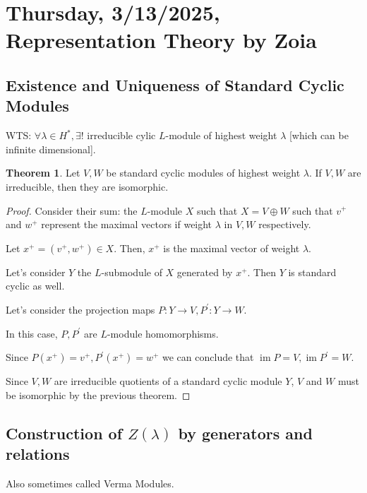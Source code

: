 \documentclass{article}
\theoremstyle{definition}
\newtheorem{theorem}{Theorem}
\begin{document}
    \section{Thursday, 3/13/2025, Representation Theory by Zoia}

    \subsection*{Existence and Uniqueness of Standard Cyclic Modules}

    WTS: \(\forall \lambda \in H^{\ast}, \exists !\) irreducible cylic \(L\)-module of highest weight \(\lambda\) [which can be infinite dimensional].
    
    \begin{theorem}
        Let \(V,W\) be standard cyclic modules of highest weight \(\lambda\). If \(V,W\) are irreducible, then they are isomorphic.
    \end{theorem}
    
    \begin{proof}
        Consider their sum: the \(L\)-module \(X\) such that \(X = V \oplus W\) such that \(v^+\) and \(w^+\) represent the maximal vectors if weight \(\lambda\) in \(V,W\) respectively.

        Let \(x^+=(v^+,w^+)\in X\). Then, \(x^+\) is the maximal vector of weight \(\lambda\).

        Let's consider \(Y\) the \(L\)-submodule of \(X\) generated by \(x^+\). Then \(Y\) is standard cyclic as well.

        Let's consider the projection maps \(P: Y \to V, P^{\prime}: Y \to W\).

        In this case, \(P, P^{\prime}\) are \(L\)-module homomorphisms.

        Since \(P(x^+)=v^+, P^{\prime}(x^+)=w^+\) we can conclude that \(\operatorname{im} P = V, \operatorname{im} P^{\prime} = W\).

        Since \(V,W\) are irreducible quotients of a standard cyclic module \(Y\), \(V\) and \(W\) must be isomorphic by the previous theorem.
    \end{proof}

    \subsection*{Construction of \(Z(\lambda)\) by generators and relations}

    Also sometimes called Verma Modules.
\end{document}

